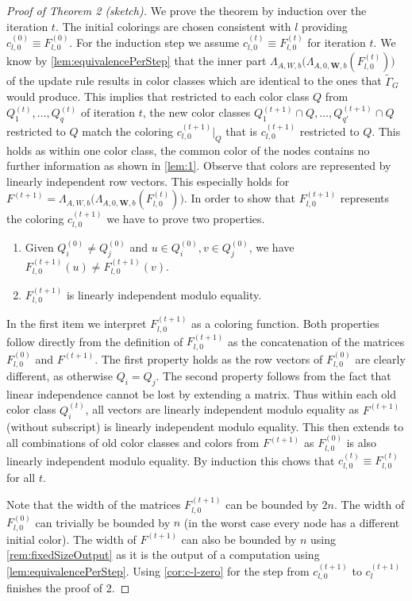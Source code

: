 \documentclass[letterpaper]{article}
\theoremstyle{definition}
\renewcommand{\vec}[1]{\mathbf{#1}} %
\begin{document}
\begin{proof}[Proof of Theorem 2 (sketch)]
	We prove the theorem by induction over the iteration $t$.
	The initial colorings are chosen consistent with $l$ providing  $c_{l,0}^{(0)} \equiv F^{(0)}_{l,0}$.
	For the induction step we assume $c_{l,0}^{(t)} \equiv F^{(t)}_{l,0}$ for iteration $t$.
	We know by \cref{lem:equivalencePerStep} that the inner part $\Lambda_{A,W,b}\big(\Lambda_{A,0,\vec W,b} (F^{(t)}_{l,0})\big)$ of the update rule results in color classes which are identical to the ones that $\tilde\Gamma_G$ would produce.
	This implies that restricted to each color class $Q$ from $Q_1^{(t)},\dots,Q_q^{(t)}$ of iteration $t$, the new color classes $Q_1^{(t+1)}\cap Q,\dots,Q_{q'}^{(t+1)}\cap Q$ restricted to $Q$ match the coloring $c_{l,0}^{(t+1)}|_Q$ that is $c_{l,0}^{(t+1)}$ restricted to $Q$.
	This holds as within one color class, the common color of the nodes contains no further information as shown in \cref{lem:1}.
	Observe that colors are represented by linearly independent row vectors.
	This especially holds for $F^{(t+1)} = \Lambda_{A,W,b}\big(\Lambda_{A,0,\vec W,b} (F^{(t)}_{l,0})\big)$.
	In order to show that $F^{(t+1)}_{l,0}$ represents the coloring $c^{(t+1)}_{l,0}$ we have to prove two properties.
	\begin{enumerate}
		\item Given $Q_i^{(0)} \neq Q_j^{(0)}$ and $u\in Q_i^{(0)}, v\in Q_j^{(0)}$, we have $F^{(t+1)}_{l,0}(u)\neq F^{(t+1)}_{l,0}(v)$.
		\item $F^{(t+1)}_{l,0}$ is linearly independent modulo equality.
	\end{enumerate}
	In the first item we interpret $F^{(t+1)}_{l,0}$ as a coloring function. Both properties follow directly from the definition of $F^{(t+1)}_{l,0}$ as the concatenation of the matrices $F^{(0)}_{l,0}$ and $F^{(t+1)}$.
	The first property holds as the row vectors of $F^{(0)}_{l,0}$ are clearly different, as otherwise $Q_i=Q_j$.
	The second property follows from the fact that linear independence cannot be lost by extending a matrix.
	Thus within each old color class $Q_i^{(t)}$, all vectors are linearly independent modulo equality as $F^{(t+1)}$ (without subscript) is linearly independent modulo equality.
	This then extends to all combinations of old color classes and colors from $F^{(t+1)}$ as $F^{(0)}_{l,0}$ is also linearly independent modulo equality.
	By induction this chows that $c_{l,0}^{(t)} \equiv F^{(t)}_{l,0}$ for all $t$.
				
	Note that the width of the matrices $F^{(t+1)}_{l,0}$ can be bounded by $2n$.
	The width of $F^{(0)}_{l,0}$ can trivially be bounded by $n$ (in the worst case every node has a different initial color).
	The width of $F^{(t+1)}$ can also be bounded by $n$ using \cref{rem:fixedSizeOutput} as it is the output of a computation using \cref{lem:equivalencePerStep}. Using \cref{cor:c-l-zero} for the step from $c^{(t+1)}_{l,0}$ to $c^{(t+1)}_{l}$ finishes the proof of 2.
\end{proof}
\end{document}
